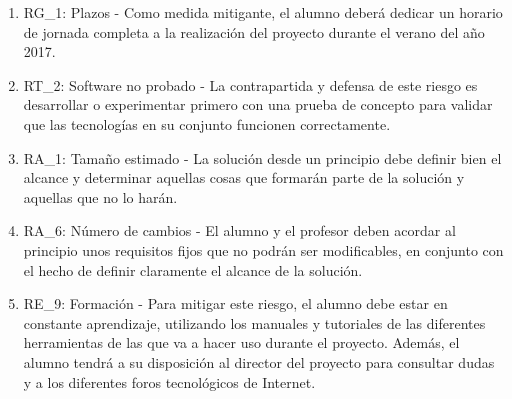 \begin{enumerate}
\begin{enumerate}
\item RG\_1: Plazos - Como medida mitigante, el alumno deberá dedicar un horario de jornada completa a la realización del proyecto durante el verano del año 2017. 
\item RT\_2: Software no probado - La contrapartida y defensa de este riesgo es desarrollar o experimentar primero con una prueba de concepto para validar que las tecnologías en su conjunto funcionen correctamente. 
\item RA\_1: Tamaño estimado - La solución desde un principio debe definir bien el alcance y determinar aquellas cosas que formarán parte de la solución y aquellas que no lo harán. 
\item RA\_6: Número de cambios - El alumno y el profesor deben acordar al principio unos requisitos fijos que no podrán ser modificables, en conjunto con el hecho de definir claramente el alcance de la solución.
\item RE\_9: Formación - Para mitigar este riesgo, el alumno debe estar en constante aprendizaje, utilizando los manuales y tutoriales de las diferentes herramientas de las que va a hacer uso durante el proyecto. Además, el alumno tendrá a su disposición al director del proyecto para consultar dudas y a los diferentes foros tecnológicos de Internet. 
\end{enumerate}
\end{enumerate}

